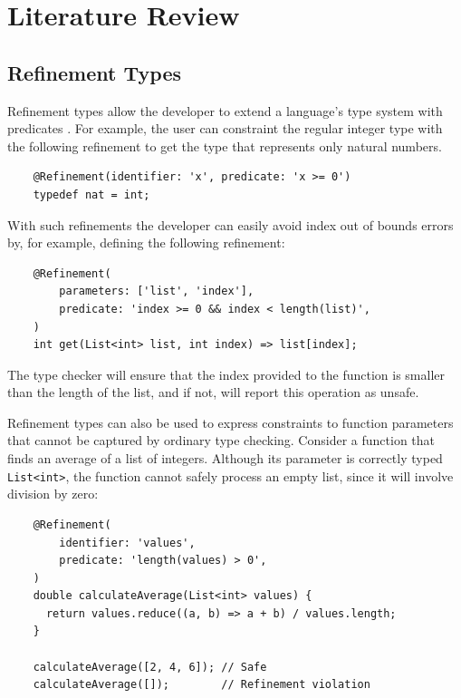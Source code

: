 \chapter{Literature Review}
\label{chap:lr}

\section{Refinement Types}
\label{sec:refinement_types_defintion}
Refinement types allow the developer to extend a language's type system
with predicates \cite{jhalaRefinementTypesTutorial2020}. For example, the user can constraint
the regular integer type with the following refinement 
to get the type that represents only natural numbers.
\begin{lstlisting}
    @Refinement(identifier: 'x', predicate: 'x >= 0')
    typedef nat = int;
\end{lstlisting}
With such refinements the developer can easily avoid index out of bounds errors by, for example,
defining the following refinement:
\begin{lstlisting}
    @Refinement(
        parameters: ['list', 'index'],
        predicate: 'index >= 0 && index < length(list)',
    )
    int get(List<int> list, int index) => list[index];
\end{lstlisting}
The type checker will ensure that the index provided to the function is smaller than the
length of the list, and if not, will report this operation as unsafe.

Refinement types can also be used to express constraints to function parameters that 
cannot be captured by ordinary type checking. Consider a function that finds an average of
a list of integers. Although its parameter is correctly typed \texttt{List<int>}, the 
function cannot safely process an empty list, since it will involve division by zero:
\begin{lstlisting}
    @Refinement(
        identifier: 'values',
        predicate: 'length(values) > 0',
    )
    double calculateAverage(List<int> values) {
      return values.reduce((a, b) => a + b) / values.length;
    }

    calculateAverage([2, 4, 6]); // Safe
    calculateAverage([]);        // Refinement violation
\end{lstlisting}


